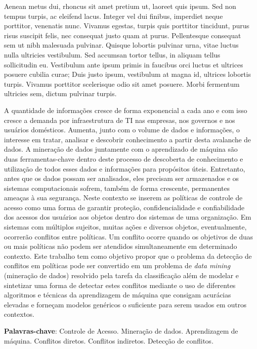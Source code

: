 Aenean metus dui, rhoncus sit amet pretium ut, laoreet quis ipsum. Sed non tempus turpis, ac eleifend lacus. Integer vel dui finibus, imperdiet neque porttitor, venenatis nunc. Vivamus egestas, turpis quis porttitor tincidunt, purus risus suscipit felis, nec consequat justo quam at purus. Pellentesque consequat sem ut nibh malesuada pulvinar. Quisque lobortis pulvinar urna, vitae luctus nulla ultricies vestibulum. Sed accumsan tortor tellus, in aliquam tellus sollicitudin eu. Vestibulum ante ipsum primis in faucibus orci luctus et ultrices posuere cubilia curae; Duis justo ipsum, vestibulum at magna id, ultrices lobortis turpis. Vivamus porttitor scelerisque odio sit amet posuere. Morbi fermentum ultricies sem, dictum pulvinar turpis. 

\begin{resumo}


A quantidade de informações cresce de forma exponencial a cada ano e com isso cresce a demanda por infraestrutura de TI nas empresas, nos governos e nos usuários domésticos. Aumenta, junto com o volume de dados e informações, o interesse em tratar, analisar e descobrir conhecimento a partir desta avalanche de dados. A mineração de dados juntamente com o aprendizado de máquina são duas ferramentas-chave dentro deste processo de descoberta de conhecimento e utilização de todos esses dados e informações para propósitos úteis. Entretanto, antes que os dados possam ser analisados, eles precisam ser armazenados e os sistemas computacionais sofrem, também de forma crescente, permanentes ameaças à sua segurança. Neste contexto se inserem as políticas de controle de acesso como uma forma de garantir proteção, confidencialidade e confiabilidade dos acessos dos usuários aos objetos dentro dos sistemas de uma organização. Em sistemas com múltiplos sujeitos, muitas ações e diversos objetos, eventualmente, ocorrerão conflitos entre políticas. Um conflito ocorre quando os objetivos de duas ou mais políticas não podem ser atendidos simultaneamente em determinado contexto. Este trabalho tem como objetivo propor que o problema da detecção de conflitos em políticas pode ser convertido em um problema de \textit{data mining} (mineração de dados) resolvido pela tarefa da classificação além de modelar e sintetizar uma forma de detectar estes conflitos mediante o uso de diferentes algoritmos e técnicas da aprendizagem de máquina que consigam acurácias elevadas e forneçam modelos genéricos o suficiente para serem usados em outros contextos.

{\hspace{-8mm} \bf{Palavras-chave}}: Controle de Acesso. Mineração de dados. Aprendizagem de máquina. Conflitos diretos. Conflitos indiretos. Detecção de conflitos.

\end{resumo}

